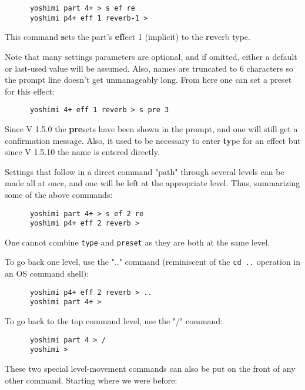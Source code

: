    \begin{verbatim}
      yoshimi part 4+ > s ef re
      yoshimi p4+ eff 1 reverb-1 >
   \end{verbatim}

   This command \textbf{s}ets the part's \textbf{ef}fect 1 (implicit) to
   the \textbf{re}verb type.

   Note that many settings parameters are optional, and if omitted,
   either a default or last-used value will be assumed. Also, names are
   truncated to 6 characters so the prompt line doesn't get unmanageably long.
   From here one can set a preset for this effect:

   \begin{verbatim}
      yoshimi 4+ eff 1 reverb > s pre 3
   \end{verbatim}

   Since V 1.5.0 the \textbf{pre}sets have been shown in the prompt, and one
   will still get a confirmation message. Also, it used to be necessary to
   enter \textbf{ty}pe for an effect but since V 1.5.10 the name is entered directly.

   Settings that follow in a direct command "path" through several levels
   can be made all at once, and one will be left at the appropriate level.
   Thus, summarizing some of the above commands:

   \begin{verbatim}
      yoshimi part 4+ > s ef 2 re
      yoshimi p4+ eff 2 reverb >
   \end{verbatim}

   One cannot combine \texttt{type} and \texttt{preset} as they
   are both at the same level.

   To go back one level, use the ".." command (reminiscent of the \texttt{cd ..} operation in an OS command shell):

   \begin{verbatim}
      yoshimi p4+ eff 2 reverb > ..
      yoshimi part 4+ >
   \end{verbatim}

   To go back to the top command level, use the "/" command:

   \begin{verbatim}
      yoshimi part 4 > /
      yoshimi >
   \end{verbatim}

   These two special level-movement commands can also be put on the front of
   any other command.  Starting where we were before:

